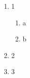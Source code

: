 \begin{enumerate}
    \item 1
    \begin{enumerate}
        \item 
           a
        \item 
            b
    \end{enumerate}
    \item 2
    \item 3
\end{enumerate}

